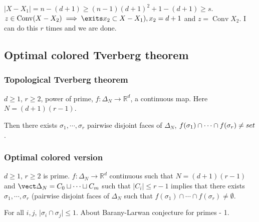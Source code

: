 \documentclass[11pt]{article}
\def\R{\mathbb{R}}
\def\conv{\operatorname{Conv}}
\begin{document}
\(\vert X - X_1 \vert = n - (d+1) \ge (n-1)(d+1)^2 + 1 - (d+1) \ge s\). \(z \in
    \conv(X - X_2) \implies \exits x_2 \subset X - X_1), x_2 = d+1\) and \(z =
    \conv X_2\). I can do this \(r\) times and we are done.
\subsection{Optimal colored Tverberg theorem}
\label{sec:org5f7527d}
\subsubsection{Topological Tverberg theorem}
\label{sec:org222b64f}
\(d \ge 1\), \(r \ge 2\), power of prime, \(f \colon \Delta_N \rightarrow \R^d\),
a continuous map. Here \(N=(d+1)(r-1)\).

Then there exists \(\sigma_1, \cdots, \sigma_r\) pairwise disjoint faces of
\(\Delta_N\), \(f(\sigma_1) \cap \cdots \cap f(\sigma_r) \neq \empty set\).
\subsubsection{Optimal colored version}
\label{sec:org20a3586}
\(d \ge 1\), \(r\ge 2\) is prime. \(f\colon \Delta_N \rightarrow \R^d\) continuous
such that \(N=(d+1)(r-1)\) and \(\vect \Delta_N = C_0 \sqcup \cdots \sqcup C_m\)
such that \(\vert C_i \vert \le r- 1\) implies that there exists \(\sigma_1,
    \cdots, \sigma_r\) (pairwise disjoint faces of \(\Delta_N\) such that
\(f(\sigma_1)\cap \cdots \cap f(\sigma_r) \neq \emptyset\).

For all \(i, j\), \(\vert \sigma_i \cap \sigma_j \vert \le 1\). About
Barany-Larwan conjecture for primes - 1.
\end{document}
